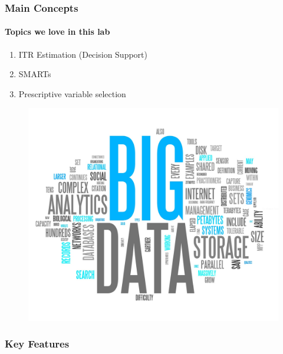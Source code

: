 \documentclass[9pt,aspectratio=169]{beamer}
\begin{document}
\begin{frame}
    \frametitle{Main Concepts}
    \framesubtitle{Topics we love in this lab}
    
    \begin{minipage}{0.5\textwidth}
        \begin{enumerate}
            \itemsep1.3em
            \item ITR Estimation (Decision Support)
            \item SMARTs
            \item Prescriptive variable selection
        \end{enumerate}
    \end{minipage} \hfill
    \begin{minipage}{0.49\textwidth}
        \begin{figure}
            \includegraphics[width=1.0\linewidth]{images/big_data_image.jpg}
        \end{figure}
    \end{minipage}
    
\end{frame}

\begin{frame}
    \frametitle{Key Features}
    
\end{frame}
\end{document}
